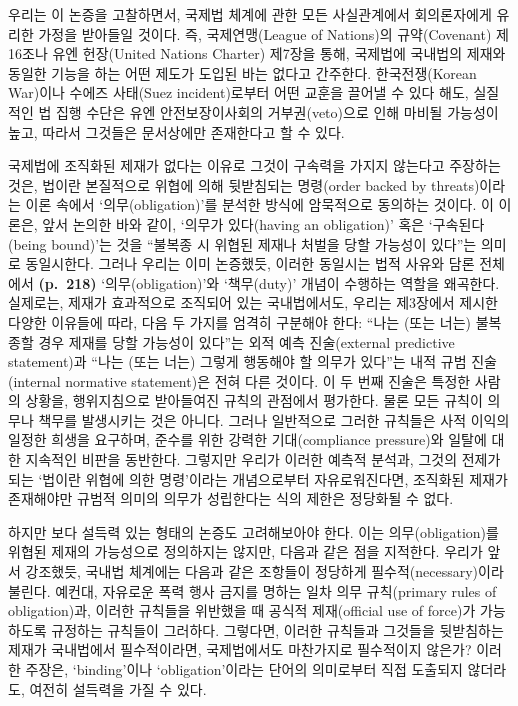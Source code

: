 우리는 이 논증을 고찰하면서, 국제법 체계에 관한 모든 사실관계에서
회의론자에게 유리한 가정을 받아들일 것이다. 즉, 국제연맹(League of
Nations)의 규약(Covenant) 제16조나 유엔 헌장(United Nations Charter)
제7장을 통해, 국제법에 국내법의 제재와 동일한 기능을 하는 어떤 제도가
도입된 바는 없다고 간주한다. 한국전쟁(Korean War)이나 수에즈 사태(Suez
incident)로부터 어떤 교훈을 끌어낼 수 있다 해도, 실질적인 법 집행 수단은
유엔 안전보장이사회의 거부권(veto)으로 인해 마비될 가능성이 높고, 따라서
그것들은 문서상에만 존재한다고 할 수 있다.

국제법에 조직화된 제재가 없다는 이유로 그것이 구속력을 가지지 않는다고
주장하는 것은, 법이란 본질적으로 위협에 의해 뒷받침되는 명령(order
backed by threats)이라는 이론 속에서 `의무(obligation)'를 분석한 방식에
암묵적으로 동의하는 것이다. 이 이론은, 앞서 논의한 바와 같이, `의무가
있다(having an obligation)' 혹은 `구속된다(being bound)'는 것을 ``불복종
시 위협된 제재나 처벌을 당할 가능성이 있다''는 의미로 동일시한다. 그러나
우리는 이미 논증했듯, 이러한 동일시는 법적 사유와 담론 전체에서
\textbf{(p.~218)} `의무(obligation)'와 `책무(duty)' 개념이 수행하는
역할을 왜곡한다. 실제로는, 제재가 효과적으로 조직되어 있는 국내법에서도,
우리는 제3장에서 제시한 다양한 이유들에 따라, 다음 두 가지를 엄격히
구분해야 한다: ``나는 (또는 너는) 불복종할 경우 제재를 당할 가능성이
있다''는 외적 예측 진술(external predictive statement)과 ``나는 (또는
너는) 그렇게 행동해야 할 의무가 있다''는 내적 규범 진술(internal
normative statement)은 전혀 다른 것이다. 이 두 번째 진술은 특정한 사람의
상황을, 행위지침으로 받아들여진 규칙의 관점에서 평가한다. 물론 모든
규칙이 의무나 책무를 발생시키는 것은 아니다. 그러나 일반적으로 그러한
규칙들은 사적 이익의 일정한 희생을 요구하며, 준수를 위한 강력한
기대(compliance pressure)와 일탈에 대한 지속적인 비판을 동반한다.
그렇지만 우리가 이러한 예측적 분석과, 그것의 전제가 되는 `법이란 위협에
의한 명령'이라는 개념으로부터 자유로워진다면, 조직화된 제재가 존재해야만
규범적 의미의 의무가 성립한다는 식의 제한은 정당화될 수 없다.

하지만 보다 설득력 있는 형태의 논증도 고려해보아야 한다. 이는
의무(obligation)를 위협된 제재의 가능성으로 정의하지는 않지만, 다음과
같은 점을 지적한다. 우리가 앞서 강조했듯, 국내법 체계에는 다음과 같은
조항들이 정당하게 필수적(necessary)이라 불린다. 예컨대, 자유로운 폭력
행사 금지를 명하는 일차 의무 규칙(primary rules of obligation)과, 이러한
규칙들을 위반했을 때 공식적 제재(official use of force)가 가능하도록
규정하는 규칙들이 그러하다. 그렇다면, 이러한 규칙들과 그것들을
뒷받침하는 제재가 국내법에서 필수적이라면, 국제법에서도 마찬가지로
필수적이지 않은가? 이러한 주장은, `binding'이나 `obligation'이라는
단어의 의미로부터 직접 도출되지 않더라도, 여전히 설득력을 가질 수 있다.

